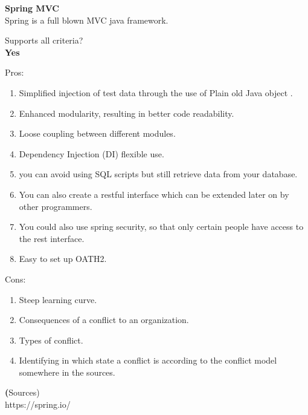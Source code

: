 \textbf{Spring MVC} \\
Spring is a full blown MVC java framework.

Supports all criteria? \\
\textbf{Yes}

Pros:
\begin{enumerate}
	\item Simplified injection of test data through the use of Plain old Java object .
	\item Enhanced modularity, resulting in better code readability.
	\item Loose coupling between different modules.
	\item Dependency Injection (DI) flexible use.
	\item you can avoid using SQL scripts but still retrieve data from your database.
	\item You can also create a restful interface which can be extended later on by other programmers.
	\item You could also use spring security, so that only certain people have access to the rest interface.
	\item Easy to set up OATH2. 
\end{enumerate}
Cons:
\begin{enumerate}
	\item Steep learning curve.
	\item Consequences of a conflict to an organization.
	\item Types of conflict.
	\item Identifying in which state a conflict is according to the conflict model somewhere in the sources.
\end{enumerate}

\textbf(Sources)\\
https://spring.io/